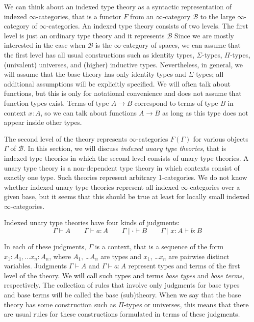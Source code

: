\documentclass[reqno]{amsart}
\theoremstyle{definition}
\theoremstyle{remark}
\newcommand{\type}{}
\newcommand{\ob}{}
\numberwithin{figure}{section}
\begin{document}
We can think about an indexed type theory as a syntactic representation of indexed $\infty$-categories, that is a functor $F$ from an $\infty$-category $\mathcal{B}$ to the large $\infty$-category of $\infty$-categories.
An indexed type theory consists of two levels.
The first level is just an ordinary type theory and it represents $\mathcal{B}$
Since we are mostly interested in the case when $\mathcal{B}$ is the $\infty$-category of spaces,
we can assume that the first level has all usual constructions such as identity types, $\Sigma$-types, $\Pi$-types, (univalent) universes, and (higher) inductive types.
Nevertheless, in general, we will assume that the base theory has only identity types and $\Sigma$-types; all additional assumptions will be explicitly specified.
We will often talk about functions, but this is only for notational convenience and does not assume that function types exist.
Terms of type $A \to B$ correspond to terms of type $B$ in context $x : A$, so we can talk about functions $A \to B$ as long as this type does not appear inside other types.

The second level of the theory represents $\infty$-categories $F(\Gamma)$ for various objects $\Gamma$ of $\mathcal{B}$.
In this section, we will discuss \emph{indexed unary type theories}, that is indexed type theories in which the second level consists of unary type theories.
A unary type theory is a non-dependent type theory in which contexts consist of exactly one type.
Such theories represent arbitrary 1-categories.
We do not know whether indexed unary type theories represent all indexed $\infty$-categories over a given base, but it seems that this should be true at least for locally small indexed $\infty$-categories.

Indexed unary type theories have four kinds of judgments:
\[ \Gamma \vdash A \type \qquad \Gamma \vdash a : A \qquad \Gamma \mid \cdot \vdash B \ob \qquad \Gamma \mid x : A \vdash b : B \]

In each of these judgments, $\Gamma$ is a context, that is a sequence of the form $x_1 : A_1, \ldots x_n : A_n$, where $A_1$, \ldots $A_n$ are types and $x_1$, \ldots $x_n$ are pairwise distinct variables.
Judgments $\Gamma \vdash A \type$ and $\Gamma \vdash a : A$ represent types and terms of the first level of the theory.
We will call such types and terms \emph{base types} and \emph{base terms}, respectively.
The collection of rules that involve only judgments for base types and base terms will be called the base (sub)theory.
When we say that the base theory has some construction such as $\Pi$-types or universes, this means that there are usual rules for these constructions formulated in terms of these judgments.
\end{document}
